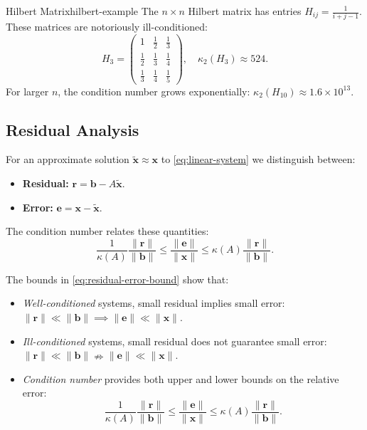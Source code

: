 \documentclass[../../main.tex]{subfiles}
\begin{document}
\begin{example}{Hilbert Matrix}{hilbert-example}
    The $n \times n$ Hilbert matrix has entries $H_{ij} = \frac{1}{i+j-1}$. These matrices are notoriously ill-conditioned:
    \[
        H_3 = \begin{pmatrix}
            1           & \frac{1}{2} & \frac{1}{3} \\
            \frac{1}{2} & \frac{1}{3} & \frac{1}{4} \\
            \frac{1}{3} & \frac{1}{4} & \frac{1}{5}
        \end{pmatrix}, \quad \kappa_2(H_3) \approx 524.
    \]
    For larger $n$, the condition number grows exponentially: $\kappa_2(H_{10}) \approx 1.6 \times 10^{13}$.
\end{example}

\subsection{Residual Analysis}
For an approximate solution $\tilde{\mathbf{x}} \approx \mathbf{x}$ to \eqref{eq:linear-system} we distinguish between:
\begin{itemize}
    \item \textbf{Residual:} $\mathbf{r} = \mathbf{b} - A\tilde{\mathbf{x}}$.
    \item \textbf{Error:} $\mathbf{e} = \mathbf{x} - \tilde{\mathbf{x}}$.
\end{itemize}

The condition number relates these quantities:
\begin{equation}
    \frac{1}{\kappa(A)} \frac{\|\mathbf{r}\|}{\|\mathbf{b}\|} \leq \frac{\|\mathbf{e}\|}{\|\mathbf{x}\|} \leq \kappa(A) \frac{\|\mathbf{r}\|}{\|\mathbf{b}\|}.
    \label{eq:residual-error-bound}
\end{equation}

The bounds in \eqref{eq:residual-error-bound} show that:

\begin{itemize}
    \item \emph{Well-conditioned} systems, small residual implies small error: $\|\mathbf{r}\| \ll \|\mathbf{b}\| \implies \|\mathbf{e}\| \ll \|\mathbf{x}\|$.
    \item \emph{Ill-conditioned} systems, small residual does not guarantee small error: $\|\mathbf{r}\| \ll \|\mathbf{b}\| \nRightarrow \|\mathbf{e}\| \ll \|\mathbf{x}\|$.
    \item \emph{Condition number} provides both upper and lower bounds on the relative error:
    \[
    \frac{1}{\kappa(A)} \frac{\|\mathbf{r}\|}{\|\mathbf{b}\|} \leq \frac{\|\mathbf{e}\|}{\|\mathbf{x}\|} \leq \kappa(A) \frac{\|\mathbf{r}\|}{\|\mathbf{b}\|}.
    \]
\end{itemize}
\end{document}
